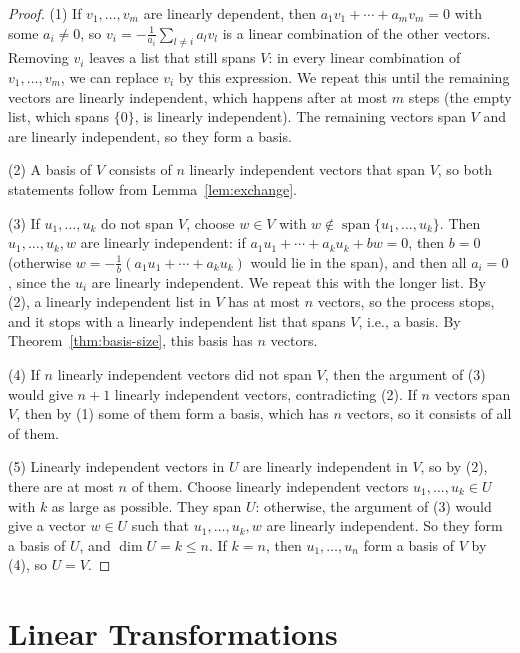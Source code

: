 \documentclass[11pt]{article}
\theoremstyle{definition}
\theoremstyle{plain}
\theoremstyle{remark}
\DeclareMathOperator{\Span}{span}
\begin{document}
\begin{proof}
    (1) If $v_1, \ldots, v_m$ are linearly dependent, then $a_1 v_1 + \cdots + a_m v_m = 0$ with some $a_i \neq 0$, so $v_i = -\frac{1}{a_i}\sum_{l \neq i} a_l v_l$ is a linear combination of the other vectors. Removing $v_i$ leaves a list that still spans $V$: in every linear combination of $v_1, \ldots, v_m$, we can replace $v_i$ by this expression. We repeat this until the remaining vectors are linearly independent, which happens after at most $m$ steps (the empty list, which spans $\{0\}$, is linearly independent). The remaining vectors span $V$ and are linearly independent, so they form a basis.

    (2) A basis of $V$ consists of $n$ linearly independent vectors that span $V$, so both statements follow from Lemma~\ref{lem:exchange}.

    (3) If $u_1, \ldots, u_k$ do not span $V$, choose $w \in V$ with $w \notin \Span\{u_1, \ldots, u_k\}$. Then $u_1, \ldots, u_k, w$ are linearly independent: if $a_1 u_1 + \cdots + a_k u_k + bw = 0$, then $b = 0$ (otherwise $w = -\frac{1}{b}(a_1 u_1 + \cdots + a_k u_k)$ would lie in the span), and then all $a_i = 0$, since the $u_i$ are linearly independent. We repeat this with the longer list. By (2), a linearly independent list in $V$ has at most $n$ vectors, so the process stops, and it stops with a linearly independent list that spans $V$, i.e., a basis. By Theorem~\ref{thm:basis-size}, this basis has $n$ vectors.

    (4) If $n$ linearly independent vectors did not span $V$, then the argument of (3) would give $n + 1$ linearly independent vectors, contradicting (2). If $n$ vectors span $V$, then by (1) some of them form a basis, which has $n$ vectors, so it consists of all of them.

    (5) Linearly independent vectors in $U$ are linearly independent in $V$, so by (2), there are at most $n$ of them. Choose linearly independent vectors $u_1, \ldots, u_k \in U$ with $k$ as large as possible. They span $U$: otherwise, the argument of (3) would give a vector $w \in U$ such that $u_1, \ldots, u_k, w$ are linearly independent. So they form a basis of $U$, and $\dim U = k \leq n$. If $k = n$, then $u_1, \ldots, u_n$ form a basis of $V$ by (4), so $U = V$.
\end{proof}

\section{Linear Transformations}\label{sec:linear}
\end{document}
